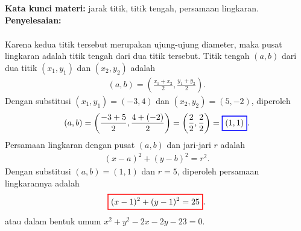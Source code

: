 \documentclass[10pt,openany,a4paper]{article}
\theoremstyle{definition}
\theoremstyle{definition}
\theoremstyle{plain}
\newenvironment{jawab}[2][tes]{%
\par\noindent\textbf{Kata kunci materi:} #1.\\
\textbf{Penyelesaian:} #2%
}{}
\begin{document}
\begin{enumerate}
\begin{jawab}[jarak titik, titik tengah, persamaan lingkaran]
{\begin{enumerate}
\begin{align*}
            \end{align*}
            Karena kedua titik tersebut merupakan ujung-ujung diameter, maka pusat lingkaran adalah titik tengah dari dua titik tersebut. Titik tengah $(a,b)$ dari dua titik $(x_1,y_1)$ dan $(x_2,y_2)$ adalah
            \begin{align*}
                (a,b) = \left(\frac{x_1+x_2}{2},\frac{y_1+y_2}{2}\right).
            \end{align*}
            Dengan substitusi $(x_1,y_1)=(-3,4)$ dan $(x_2,y_2)=(5,-2)$, diperoleh
            \begin{align*}
                (a,b) = \left(\frac{-3+5}{2}, \frac{4+(-2)}{2}\right) = \left(\frac{2}{2}, \frac{2}{2}\right) = \colorlet{oldcolor}{.}
        \color{blue}
        \setlength{\fboxrule}{1pt} \boxed{\color{oldcolor}(1,1)}\color{oldcolor}.
            \end{align*}
            Persamaan lingkaran dengan pusat $(a,b)$ dan jari-jari $r$ adalah
            \begin{align*}
                (x-a)^2 + (y-b)^2 = r^2.
            \end{align*}
            Dengan substitusi $(a,b)=(1,1)$ dan $r=5$, diperoleh persamaan lingkarannya adalah
            $$\colorlet{oldcolor}{.}
        \color{red}
        \setlength{\fboxrule}{1pt} \boxed{\color{oldcolor}(x-1)^2 + (y-1)^2 = 25}\color{oldcolor}.$$
            atau dalam bentuk umum $x^2+y^2-2x-2y-23=0$.
        \end{enumerate}
    }
    \end{jawab}


\end{enumerate}
\end{document}

